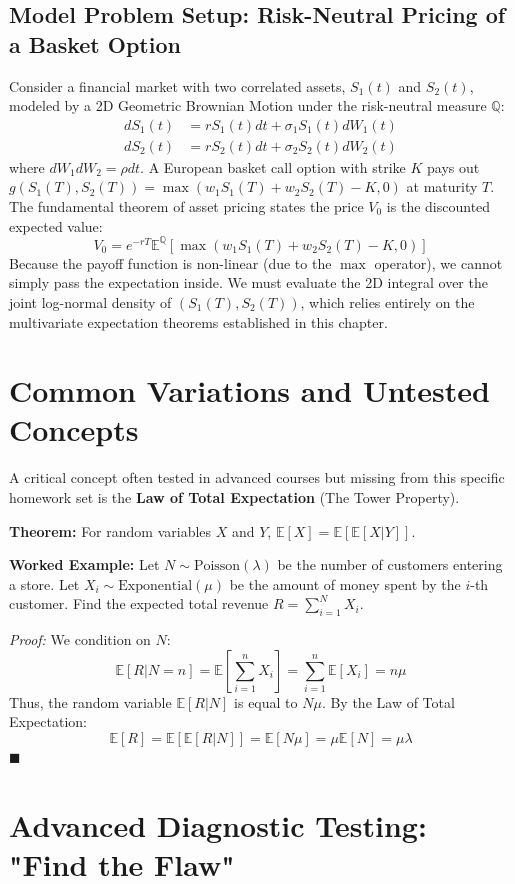 \documentclass[11pt, a4paper]{article}
\theoremstyle{definition}
\theoremstyle{remark}
\newcommand{\E}{\mathbb{E}}
\begin{document}
\subsection{Model Problem Setup: Risk-Neutral Pricing of a Basket Option}
Consider a financial market with two correlated assets, $S_1(t)$ and $S_2(t)$, modeled by a 2D Geometric Brownian Motion under the risk-neutral measure $\mathbb{Q}$:
\begin{align*}
    dS_1(t) &= r S_1(t) dt + \sigma_1 S_1(t) dW_1(t) \\
    dS_2(t) &= r S_2(t) dt + \sigma_2 S_2(t) dW_2(t)
\end{align*}
where $dW_1 dW_2 = \rho dt$. A European basket call option with strike $K$ pays out $g(S_1(T), S_2(T)) = \max(w_1 S_1(T) + w_2 S_2(T) - K, 0)$ at maturity $T$.
The fundamental theorem of asset pricing states the price $V_0$ is the discounted expected value:
\[
V_0 = e^{-rT} \E^{\mathbb{Q}} \left[ \max(w_1 S_1(T) + w_2 S_2(T) - K, 0) \right]
\]
Because the payoff function is non-linear (due to the $\max$ operator), we cannot simply pass the expectation inside. We must evaluate the 2D integral over the joint log-normal density of $(S_1(T), S_2(T))$, which relies entirely on the multivariate expectation theorems established in this chapter.

\newpage
\section{Common Variations and Untested Concepts}

A critical concept often tested in advanced courses but missing from this specific homework set is the \textbf{Law of Total Expectation} (The Tower Property).

\textbf{Theorem:} For random variables $X$ and $Y$, $\E[X] = \E[\E[X|Y]]$.

\textbf{Worked Example:} Let $N \sim \text{Poisson}(\lambda)$ be the number of customers entering a store. Let $X_i \sim \text{Exponential}(\mu)$ be the amount of money spent by the $i$-th customer. Find the expected total revenue $R = \sum_{i=1}^N X_i$.

\textit{Proof:} We condition on $N$:
\[
\E[R | N = n] = \E\left[ \sum_{i=1}^n X_i \right] = \sum_{i=1}^n \E[X_i] = n\mu
\]
Thus, the random variable $\E[R|N]$ is equal to $N\mu$.
By the Law of Total Expectation:
\[
\E[R] = \E[\E[R|N]] = \E[N\mu] = \mu\E[N] = \mu\lambda
\]
\hfill $\blacksquare$

\section{Advanced Diagnostic Testing: "Find the Flaw"}
\end{document}
